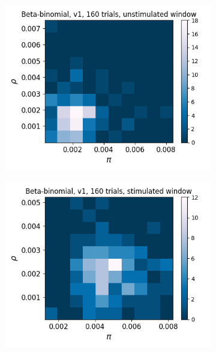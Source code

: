 \begin{figure}[p]
\begin{subfigure}[h]{0.5\linewidth}
      \end{subfigure}
      \begin{subfigure}[h]{0.5\linewidth}
        \includegraphics[width=\linewidth]{figures/conway_maxwell/v1_1ms_beta_binom_unstim.png}
        \label{fig:v1_1ms_beta_binom_unstim}
      \end{subfigure}
      \begin{subfigure}[h]{0.5\linewidth}
        \includegraphics[width=\linewidth]{figures/conway_maxwell/v1_1ms_beta_binom_stim.png}

\end{subfigure}
\end{figure}

